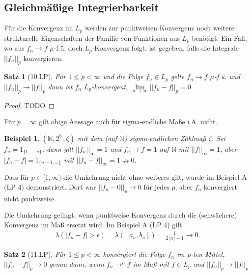 \documentclass[]{article}
\newtheorem{theorem}{Satz}
\newtheorem*{example}{Beispiel}
\begin{document}
\subsection{Gleichmäßige Integrierbarkeit}
Für die Konvergenz im $L_p$ werden zur punktweisen Konvergenz noch weitere strukturelle Eigenschaften der Familie von Funktionen aus $L_p$ benötigt. Ein Fall, wo aus $f_n \rightarrow f$ $\mu$-f.ü. doch $L_p$-Konvergenz folgt, ist gegeben, falls die Integrale $||f_n||_p$ konvergieren.

\begin{theorem}[10.LP]
	Für $1\leq p < \infty$ und die Folge $f_n \in L_p$ gelte $f_n \rightarrow f$ $\mu$-f.ü. und $||f_n||_p \rightarrow ||f||_p$ dann ist $f_n$ $L_p$-konvergent, $\lim\limits_{n\rightarrow\infty} ||f_n - f||_p = 0$
\end{theorem}

\begin{proof}
	TODO
\end{proof}

Für $p = \infty$ gilt obige Aussage auch für sigma-endliche Maße i.A. nicht.

\begin{example}
	$(\mathbb{N}, 2^\mathbb{N}, \zeta)$ mit dem (auf $\mathbb{N}$) sigma-endlichen Zählmaß $\zeta$. Sei $f_n = 1_{\{1,...,n\}}$, dann gilt $||f_n||_\infty = 1$ und $f_n \rightarrow f = 1$ auf $\mathbb{N}$ mit $||f||_\infty = 1$, aber $|f_n - f| = 1_{\{n+1,...\}}$ mit $||f_n - f||_\infty = 1 \nrightarrow 0$.
\end{example}

Dass für $p \in [1, \infty)$ die Umkehrung nicht ohne weiteres gilt, wurde im Beispiel A (LP 4) demonstriert. Dort war $||f_n - 0||_p \rightarrow 0$ für jedes $p$, aber $f_n$ konvergiert nicht punktweise.

Die Umkehrung gelingt, wenn punktweise Konvergenz durch die (schwächere) Konvergenz im Maß ersetzt wird. Im Beispiel A (LP 4) gilt
\begin{align*}
	\lambda(|f_n - f| > \epsilon) = \lambda([a_n, b_n]) = \frac{1}{2 \lfloor n \rfloor - 1} \rightarrow 0.
\end{align*}

\begin{theorem}[11.LP]
	Für $1 \leq p < \infty$ konvergiert die Folge $f_n$ im p-ten Mittel, $||f_n - f||_p \rightarrow 0$ genau dann, wenn $f_n \rightarrow^\mu f$ im Maß mit $f \in L_p$ und $||f_n||_p \rightarrow ||f||_p$
\end{theorem}
\end{document}
